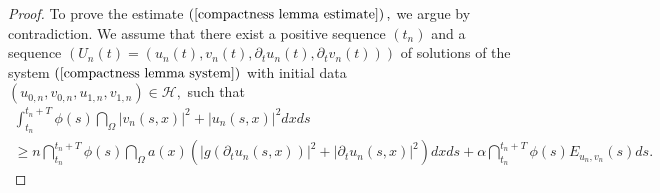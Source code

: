 \documentclass[11pt,reqno]{amsart}
\theoremstyle{plain}
\numberwithin{equation}{section}
\numberwithin{equation}{section}
\begin{document}
\begin{proof}
To prove the estimate $\left( \ref{compactness lemma estimate}\right) ,$ we
argue by contradiction. We assume that there exist a positive sequence $%
\left( t_{n}\right) $ and a sequence $\left( U_{n}\left( t\right) =\left(
u_{n}\left( t\right) ,v_{n}\left( t\right) ,\partial _{t}u_{n}\left(
t\right) ,\partial _{t}v_{n}\left( t\right) \right) \right) $ of solutions
of the system $\left( \ref{compactness lemma system}\right) $ with initial
data $\left( u_{0,n},v_{0,n},u_{1,n},v_{1,n}\right) \in \mathcal{H},$ such
that%
\begin{equation}
\begin{array}{l}
\int_{t_{n}}^{t_{n}+T}\phi \left( s\right) \dint_{\Omega }\left\vert
v_{n}\left( s,x\right) \right\vert ^{2}+\left\vert u_{n}\left( s,x\right)
\right\vert ^{2}dxds \\ 
\geq n\dint_{t_{n}}^{t_{n}+T}\phi \left( s\right) \dint_{\Omega }a\left(
x\right) \left( \left\vert g\left( \partial _{t}u_{n}\left( s,x\right)
\right) \right\vert ^{2}+\left\vert \partial _{t}u_{n}\left( s,x\right)
\right\vert ^{2}\right) dxds+\alpha \dint_{t_{n}}^{t_{n}+T}\phi \left(
s\right) E_{u_{n},v_{n}}\left( s\right) ds.%
\end{array}
\label{compactness lemma contradiction estimate}
\end{equation}


\end{proof}
\end{document}
